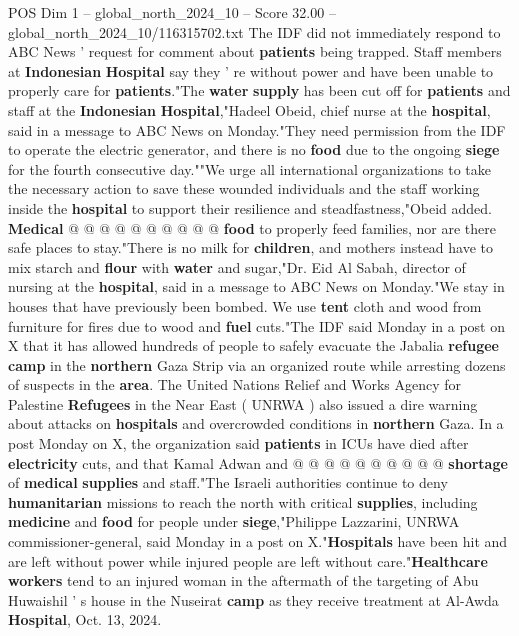 \begin{textsample}{POS Dim 1 – global\_north\_2024\_10 – Score 32.00 – global\_north\_2024\_10/116315702.txt}
The IDF did not immediately respond to ABC News ' request for comment about \textbf{patients} being trapped.
Staff members at \textbf{Indonesian} \textbf{Hospital} say they ' re without power and have been unable to properly care for \textbf{patients}."The \textbf{water} \textbf{supply} has been cut off for \textbf{patients} and staff at the \textbf{Indonesian} \textbf{Hospital},"Hadeel Obeid, chief nurse at the \textbf{hospital}, said in a message to ABC News on Monday."They need permission from the IDF to operate the electric generator, and there is no \textbf{food} due to the ongoing \textbf{siege} for the fourth consecutive day.""We urge all international organizations to take the necessary action to save these wounded individuals and the staff working inside the \textbf{hospital} to support their resilience and steadfastness,"Obeid added. \textbf{Medical} @ @ @ @ @ @ @ @ @ @ \textbf{food} to properly feed families, nor are there safe places to stay."There is no milk for \textbf{children}, and mothers instead have to mix starch and \textbf{flour} with \textbf{water} and sugar,"Dr.
Eid Al Sabah, director of nursing at the \textbf{hospital}, said in a message to ABC News on Monday."We stay in houses that have previously been bombed.
We use \textbf{tent} cloth and wood from furniture for fires due to wood and \textbf{fuel} cuts."The IDF said Monday in a post on X that it has allowed hundreds of people to safely evacuate the Jabalia \textbf{refugee} \textbf{camp} in the \textbf{northern} Gaza Strip via an organized route while arresting dozens of suspects in the \textbf{area}.
The United Nations Relief and Works Agency for Palestine \textbf{Refugees} in the Near East ( UNRWA ) also issued a dire warning about attacks on \textbf{hospitals} and overcrowded conditions in \textbf{northern} Gaza.
In a post Monday on X, the organization said \textbf{patients} in ICUs have died after \textbf{electricity} cuts, and that Kamal Adwan and @ @ @ @ @ @ @ @ @ @ \textbf{shortage} of \textbf{medical} \textbf{supplies} and staff."The Israeli authorities continue to deny \textbf{humanitarian} missions to reach the north with critical \textbf{supplies}, including \textbf{medicine} and \textbf{food} for people under \textbf{siege},"Philippe Lazzarini, UNRWA commissioner-general, said Monday in a post on X."\textbf{Hospitals} have been hit and are left without power while injured people are left without care."\textbf{Healthcare} \textbf{workers} tend to an injured woman in the aftermath of the targeting of Abu Huwaishil ' s house in the Nuseirat \textbf{camp} as they receive treatment at Al-Awda \textbf{Hospital}, Oct. 13, 2024.

\end{textsample}

